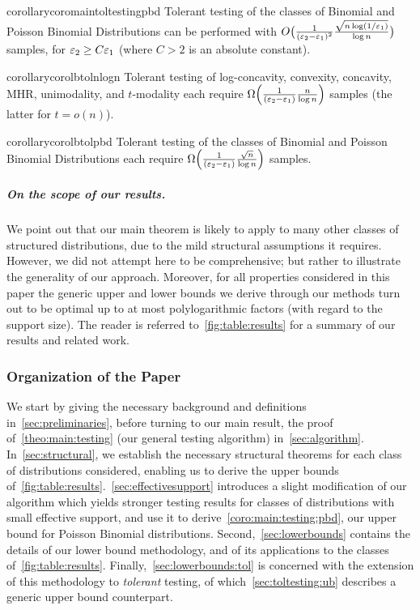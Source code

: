 \begin{restatable}{corollary}{coromaintoltestingpbd}\label{coro:main:tol:testing:pbd}
Tolerant testing of the classes of Binomial and Poisson Binomial Distributions can be performed with $O\big( \frac{1}{(\varepsilon_2-\varepsilon_1)^2}\frac{\sqrt{n\log({1}/{\varepsilon_1})}}{\log n} \big)$ samples, for $\varepsilon_2 \geq C \varepsilon_1$ (where $C>2$ is an absolute constant).
\end{restatable}

\begin{restatable}{corollary}{corolbtolnlogn}\label{coro:tol:lb:nlogn}
  Tolerant testing of log-concavity, convexity, concavity, MHR, unimodality, and $t$-modality each require $\bigOmega{\frac{1}{(\eps_2-\eps_1)}\frac{n}{\log n}}$ samples (the latter for $t = o(n)$).
\end{restatable}

\begin{restatable}{corollary}{corolbtolpbd}\label{coro:lb:tol:pbd}
  Tolerant testing of the classes of Binomial and Poisson Binomial Distributions each require $\bigOmega{\frac{1}{(\eps_2-\eps_1)}\frac{\sqrt{n}}{\log n}}$ samples.
\end{restatable}

\subparagraph{On the scope of our results.} We point out that our main theorem is likely to apply to many other classes of structured distributions, 
due to the mild structural assumptions it requires. However, we did not attempt here to be comprehensive; but rather to illustrate the generality of our approach. Moreover, for all properties considered in this paper the generic upper and lower bounds we derive through our methods turn out to be optimal up to at most polylogarithmic factors (with regard to the support size). The reader is referred to~\cref{fig:table:results} for a summary of our results and related work.

\subsubsection{Organization of the Paper}

We start by giving the necessary background and definitions in~\cref{sec:preliminaries}, before turning to our main result, the proof of~\cref{theo:main:testing} (our general testing algorithm) in~\cref{sec:algorithm}. In~\cref{sec:structural}, we establish the necessary structural theorems for each class of distributions considered, enabling us to derive the upper bounds of~\cref{fig:table:results}.~\cref{sec:effectivesupport} introduces a slight modification of our algorithm which yields stronger testing results for classes of distributions with small effective support, and use it to derive~\cref{coro:main:testing:pbd}, our upper bound for Poisson Binomial distributions. Second,~\cref{sec:lowerbounds} contains the details of our lower bound methodology, and of its applications to the classes of~\cref{fig:table:results}. Finally,~\cref{sec:lowerbounds:tol} is concerned with the extension of this methodology to \emph{tolerant} testing, of which~\cref{sec:toltesting:ub} describes a generic upper bound counterpart.
 

